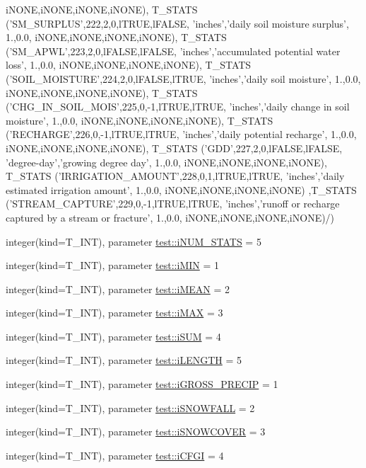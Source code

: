 \begin{DoxyCompactItemize}
iNONE,iNONE,iNONE,iNONE), T\_\-STATS ('SM\_\-SURPLUS',222,2,0,lTRUE,lFALSE, 'inches','daily soil moisture surplus', 1.,0.0, iNONE,iNONE,iNONE,iNONE), T\_\-STATS ('SM\_\-APWL',223,2,0,lFALSE,lFALSE, 'inches','accumulated potential water loss', 1.,0.0, iNONE,iNONE,iNONE,iNONE), T\_\-STATS ('SOIL\_\-MOISTURE',224,2,0,lFALSE,lTRUE, 'inches','daily soil moisture', 1.,0.0, iNONE,iNONE,iNONE,iNONE), T\_\-STATS ('CHG\_\-IN\_\-SOIL\_\-MOIS',225,0,-\/1,lTRUE,lTRUE, 'inches','daily change in soil moisture', 1.,0.0, iNONE,iNONE,iNONE,iNONE), T\_\-STATS ('RECHARGE',226,0,-\/1,lTRUE,lTRUE, 'inches','daily potential recharge', 1.,0.0, iNONE,iNONE,iNONE,iNONE), T\_\-STATS ('GDD',227,2,0,lFALSE,lFALSE, 'degree-\/day','growing degree day', 1.,0.0, iNONE,iNONE,iNONE,iNONE), T\_\-STATS ('IRRIGATION\_\-AMOUNT',228,0,1,lTRUE,lTRUE, 'inches','daily estimated irrigation amount', 1.,0.0, iNONE,iNONE,iNONE,iNONE) ,T\_\-STATS ('STREAM\_\-CAPTURE',229,0,-\/1,lTRUE,lTRUE, 'inches','runoff or recharge captured by a stream or fracture', 1.,0.0, iNONE,iNONE,iNONE,iNONE)/)
\item 
integer(kind=T\_\-INT), parameter \hyperlink{namespacetest_a2f5f426220fe1778999fe65b3c4def48}{test::iNUM\_\-STATS} = 5
\item 
integer(kind=T\_\-INT), parameter \hyperlink{namespacetest_a5e4e66d4853b73ddeb16d8ec6d2f96ba}{test::iMIN} = 1
\item 
integer(kind=T\_\-INT), parameter \hyperlink{namespacetest_ad573fcda72b69e8d829aaecc8702e369}{test::iMEAN} = 2
\item 
integer(kind=T\_\-INT), parameter \hyperlink{namespacetest_a15112155670f39cbf96fd72e177d71d3}{test::iMAX} = 3
\item 
integer(kind=T\_\-INT), parameter \hyperlink{namespacetest_acd0b0aa61e54ac17016b3ecb8846d4fb}{test::iSUM} = 4
\item 
integer(kind=T\_\-INT), parameter \hyperlink{namespacetest_ab20904e5281139e17cfa93af209e2996}{test::iLENGTH} = 5
\item 
integer(kind=T\_\-INT), parameter \hyperlink{namespacetest_a54d657be83774d91310d0ad6ab3d773f}{test::iGROSS\_\-PRECIP} = 1
\item 
integer(kind=T\_\-INT), parameter \hyperlink{namespacetest_a406398e83d202c4d496adcc1af5d6fb3}{test::iSNOWFALL} = 2
\item 
integer(kind=T\_\-INT), parameter \hyperlink{namespacetest_a0b1f3cd89bcb139c712a36ad034b58ea}{test::iSNOWCOVER} = 3
\item 
integer(kind=T\_\-INT), parameter \hyperlink{namespacetest_a03bfe6fa65e697740874c9436f435dfe}{test::iCFGI} = 4

\end{DoxyCompactItemize}
